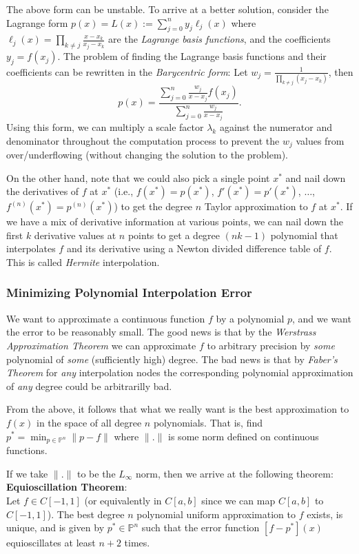 \documentclass[12pt]{article}
\begin{document}
The above form can be unstable.
To arrive at a better solution, consider the Lagrange form
$p(x) = L(x) := \sum_{j=0}^n y_j \ell_j(x)$ where 
$\ell_j(x) = \prod_{k \neq j} \frac{x-x_k}{x_j-x_k}$ are the
{\it Lagrange basis functions}, and the coefficients $y_j = f(x_j)$.
The problem of finding the Lagrange basis functions and their
coefficients can be rewritten in the {\it Barycentric form}:
Let $w_j = \frac{1}{\prod_{k\neq j} (x_j - x_k)}$,
then
$$
p(x) = \frac{\sum_{j=0}^n \frac{w_j}{x-x_j}f(x_j)}{\sum_{j=0}^n \frac{w_j}{x-x_j}}.
$$
Using this form, we can multiply a scale factor $\lambda_k$ against the numerator
and denominator throughout the computation process to prevent the $w_j$ values from
over/underflowing (without changing the solution to the problem).

On the other hand, note that we could also pick a single point $x^*$ and
nail down the derivatives of $f$ at $x^*$ (i.e.,
$f(x^*) = p(x^*)$, $f'(x^*) = p'(x^*)$, $\ldots$, $f^{(n)}(x^*)=p^{(n)}(x^*)$)
to get the degree $n$ Taylor approximation to $f$ at $x^*$.
If we have a mix of derivative information at various points, we can
nail down the first $k$ derivative values at $n$ points to get a degree
$(nk-1)$ polynomial that interpolates $f$ and its derivative using a
Newton divided difference table of $f$.
This is called {\it Hermite} interpolation.

\subsubsection*{Minimizing Polynomial Interpolation Error}

We want to approximate a continuous function $f$ by a polynomial $p$, and we want
the error to be reasonably small.
The good news is that by the {\it Werstrass Approximation Theorem} we can approximate
$f$ to arbitrary precision by {\it some} polynomial of {\it some} (sufficiently high)
degree.
The bad news is that by {\it Faber's Theorem} for {\it any} interpolation nodes the
corresponding polynomial approximation of {\it any} degree could be arbitrarilly bad.

From the above, it follows that what we really want is the best approximation
to $f(x)$ in the space of all degree $n$ polynomials.
That is, find $p^* = \min_{p \in \mathbb{P}^n} \|p - f\|$ where $\|.\|$ is some
norm defined on continuous functions.

If we take $\|.\|$ to be the $L_\infty$ norm, then we arrive at the following
theorem:\\
\textbf{Equioscillation Theorem}:\\
Let $f\in C[-1,1]$ (or equivalently in $C[a,b]$ since we can map $C[a,b]$ to $C[-1,1]$).
The best degree $n$ polynomial uniform approximation to $f$ exists, is unique, and is given 
by $p^* \in \mathbb{P}^n$ such that the error function $[f-p^*](x)$ equioscillates at 
least $n+2$ times.
\end{document}

